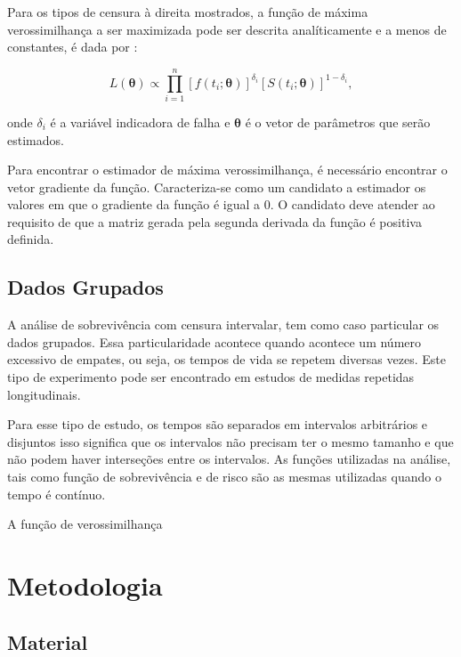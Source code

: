 \documentclass[a4paper,12pt]{article}
\begin{document}
Para os tipos de censura à direita mostrados, a função de máxima verossimilhança a ser maximizada pode ser descrita analíticamente e a menos de constantes, é dada por \cite{colosimo}:

\begin{equation} \label{eq:maxv1}
  L(\boldsymbol{\theta}) \propto \prod_{i=1}^n \left[f(t_i;\boldsymbol{\theta})\right]^{\delta_i} \left[S(t_i;\boldsymbol{\theta})\right]^{1-\delta_i},
\end{equation}

onde $\delta_i$ é a variável indicadora de falha e $\boldsymbol{\theta}$ é o vetor de parâmetros que serão estimados.

Para encontrar o estimador de máxima verossimilhança, é necessário encontrar o vetor gradiente da função. Caracteriza-se como um candidato a estimador os valores em que o gradiente da função é igual a 0. O candidato deve atender ao requisito de que a matriz gerada pela segunda derivada da função é positiva definida.%

\subsection{Dados Grupados}

A análise de sobrevivência com censura intervalar, tem como caso particular os dados grupados. Essa particularidade acontece quando acontece um número excessivo de empates, ou seja, os tempos de vida se repetem diversas vezes. Este tipo de experimento pode ser encontrado em estudos de medidas repetidas longitudinais.

Para esse tipo de estudo, os tempos são separados em intervalos arbitrários e disjuntos isso significa que os intervalos não precisam ter o mesmo tamanho e que não podem haver interseções entre os intervalos. As funções utilizadas na análise, tais como função de sobrevivência e de risco são as mesmas utilizadas quando o tempo é contínuo.

A função de verossimilhança 




\newpage
\section{Metodologia}
\noindent

\subsection{Material}
\end{document}
